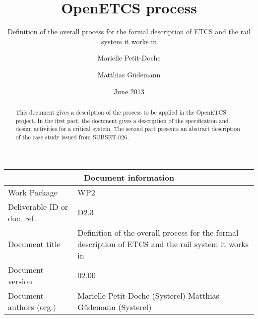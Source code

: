 \documentclass{template/openetcs_article}
\begin{document}
\frontmatter
{}




\title{OpenETCS process}

\subtitle{Definition of the overall process for the formal description of ETCS and the rail system it works in}

\date{June 2013}


\author{Marielle Petit-Doche}

\author{Matthias Güdemann}

 


\begin{abstract}
This document gives a description of the process to be applied in the OpenETCS project. In the first part, the document gives a description of the specification and design activities for a critical system. The second part presents an abstract description of the case study issued from SUBSET-026 \cite{unisig_subset-026_2012}.

\end{abstract}

\maketitle
\tableofcontents
\listoffiguresandtables
\newpage


\begin{tabular}{|p{4.4cm}|p{8.7cm}|}
\hline
\multicolumn{2}{|c|}{Document information} \\
\hline
Work Package &  WP2  \\
Deliverable ID or doc. ref. & D2.3\\
\hline
Document title & Definition of the overall process for the formal description of ETCS and the rail system it works in \\
Document version & 02.00 \\
Document authors (org.)  & Marielle Petit-Doche (Systerel) Matthias Güdemann (Systerel) \\
\hline
\end{tabular}
\end{document}

